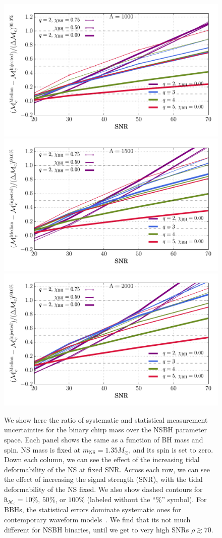 \documentclass[aps,prd,amsmath,floats,floatfix, twocolumn,
superscriptaddress,nofootinbib,showpacs]{revtex4-1}
\newcommand{\mns}{m_\mathrm{NS}}
\newcommand{\mchirp}{\mathcal{M}_c}
\newcommand{\arr}{\mathtt{R}}
\begin{document}
\begin{figure}
\includegraphics[width=0.8\columnwidth]{plots/TNMchirpBiasesOverCIWidthsVsSNR_Lambda1000_CI90_0}\\
\includegraphics[width=0.8\columnwidth]{plots/TNMchirpBiasesOverCIWidthsVsSNR_Lambda1500_CI90_0}
\includegraphics[width=0.8\columnwidth]{plots/TNMchirpBiasesOverCIWidthsVsSNR_Lambda2000_CI90_0}
\caption{We show here the ratio of systematic and statistical
measurement uncertainties for the binary chirp mass over the NSBH parameter 
space. Each panel shows the same as a function of BH mass and spin. NS mass
is fixed at $\mns=1.35M_\odot$, and its spin is set to zero. Down each column,
we can see the effect of the increasing tidal deformability of the NS at fixed
SNR. Across each row, we can see the effect of increasing the signal strength
(SNR), with the tidal deformability of the NS fixed. We also show dashed
contours for $\arr_{\mchirp}=10\%$, $50\%$, or $100\%$ (labeled
without the ``$\%$'' symbol).
% 
For BBHs, the statistical errors dominate systematic ones for contemporary
waveform models~\cite{Inprerp-LVC-WaveModels:2016,Kumar:2016dhh}. We find that
its not much different for NSBH binaries, until we get to very high SNRs
$\rho\gtrsim 70$.
}
\label{fig:TN_chirpMassBias_vs_Lambda_SNR}
\end{figure}
\end{document}
